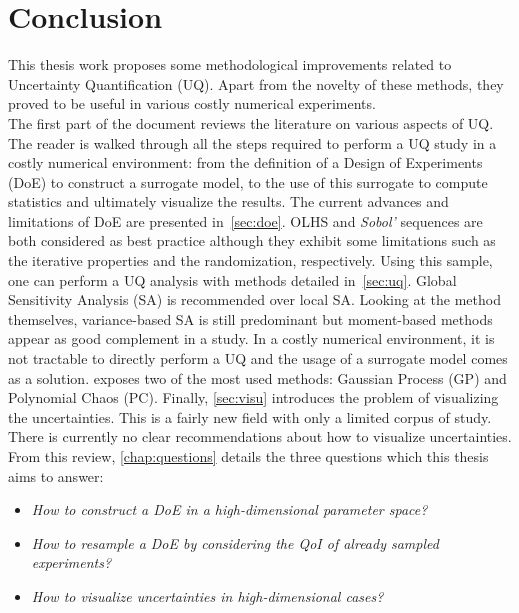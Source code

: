 \chapter*{Conclusion}


This thesis work proposes some methodological improvements related to Uncertainty Quantification (UQ). Apart from the novelty of these methods, they proved to be useful in various costly numerical experiments.\\

The first part of the document reviews the literature on various aspects of UQ. The reader is walked through all the steps required to perform a UQ study in a costly numerical environment: from the definition of a Design of Experiments (DoE) to construct a surrogate model, to the use of this surrogate to compute statistics and ultimately visualize the results. The current advances and limitations of DoE are presented in~\cref{sec:doe}. OLHS and \emph{Sobol'} sequences are both considered as best practice although they exhibit some limitations such as the iterative properties and the randomization, respectively. Using this sample, one can perform a UQ analysis with methods detailed in~\cref{sec:uq}. Global Sensitivity Analysis (SA) is recommended over local SA. Looking at the method themselves, variance-based SA is still predominant but moment-based methods appear as good complement in a study. In a costly numerical environment, it is not tractable to directly perform a UQ and the usage of a surrogate model comes as a solution.  exposes two of the most used methods: Gaussian Process (GP) and Polynomial Chaos (PC). Finally, \cref{sec:visu} introduces the problem of visualizing the uncertainties. This is a fairly new field with only a limited corpus of study. There is currently no clear recommendations about how to visualize uncertainties. From this review, \cref{chap:questions} details the three questions which this thesis aims to answer:
\begin{itemize}
\item \emph{How to construct a DoE in a high-dimensional parameter space?}
\item \emph{How to resample a DoE by considering the QoI of already sampled experiments?}
\item \emph{How to visualize uncertainties in high-dimensional cases?}
\end{itemize}

